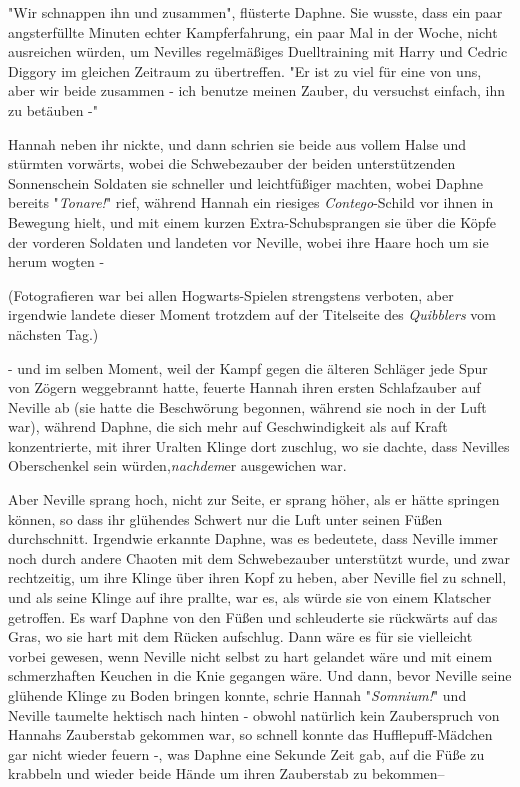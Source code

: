 {"Wir schnappen ihn und zusammen", flüsterte Daphne. Sie wusste, dass ein paar angsterfüllte Minuten echter Kampferfahrung, ein paar Mal in der Woche, nicht ausreichen würden, um Nevilles regelmäßiges Duelltraining mit Harry und Cedric Diggory im gleichen Zeitraum zu übertreffen. "Er ist zu viel für eine von uns, aber wir beide zusammen - ich benutze meinen Zauber, du versuchst einfach, ihn zu betäuben -"

Hannah neben ihr nickte, und dann schrien sie beide aus vollem Halse und stürmten vorwärts, wobei die Schwebezauber der beiden unterstützenden Sonnenschein Soldaten sie schneller und leichtfüßiger machten, wobei Daphne bereits "\emph{Tonare!}" rief, während Hannah ein riesiges \emph{Contego}-Schild vor ihnen in Bewegung hielt, und mit einem kurzen Extra-Schubsprangen sie über die Köpfe der vorderen Soldaten und landeten vor Neville, wobei ihre Haare hoch um sie herum wogten -

(Fotografieren war bei allen Hogwarts-Spielen strengstens verboten, aber irgendwie landete dieser Moment trotzdem auf der Titelseite des \emph{Quibblers} vom nächsten Tag.)

- und im selben Moment, weil der Kampf gegen die älteren Schläger jede Spur von Zögern weggebrannt hatte, feuerte Hannah ihren ersten Schlafzauber auf Neville ab (sie hatte die Beschwörung begonnen, während sie noch in der Luft war), während Daphne, die sich mehr auf Geschwindigkeit als auf Kraft konzentrierte, mit ihrer Uralten Klinge dort zuschlug, wo sie dachte, dass Nevilles Oberschenkel sein würden,\emph{nachdem}er ausgewichen war.

Aber Neville sprang hoch, nicht zur Seite, er sprang höher, als er hätte springen können, so dass ihr glühendes Schwert nur die Luft unter seinen Füßen durchschnitt. Irgendwie erkannte Daphne, was es bedeutete, dass Neville immer noch durch andere Chaoten mit dem Schwebezauber unterstützt wurde, und zwar rechtzeitig, um ihre Klinge über ihren Kopf zu heben, aber Neville fiel zu schnell, und als seine Klinge auf ihre prallte, war es, als würde sie von einem Klatscher getroffen. Es warf Daphne von den Füßen und schleuderte sie rückwärts auf das Gras, wo sie hart mit dem Rücken aufschlug. Dann wäre es für sie vielleicht vorbei gewesen, wenn Neville nicht selbst zu hart gelandet wäre und mit einem schmerzhaften Keuchen in die Knie gegangen wäre. Und dann, bevor Neville seine glühende Klinge zu Boden bringen konnte, schrie Hannah "\emph{Somnium!}" und Neville taumelte hektisch nach hinten - obwohl natürlich kein Zauberspruch von Hannahs Zauberstab gekommen war, so schnell konnte das Hufflepuff-Mädchen gar nicht wieder feuern -, was Daphne eine Sekunde Zeit gab, auf die Füße zu krabbeln und wieder beide Hände um ihren Zauberstab zu bekommen--

}
